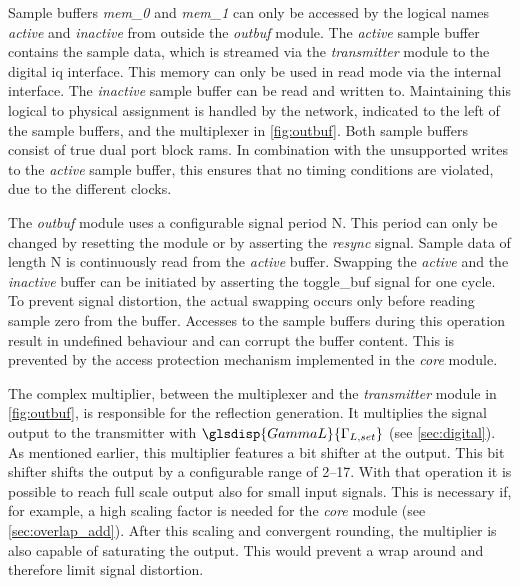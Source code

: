\documentclass[12pt,a4paper,parskip=full,abstract=true,BCOR=12mm]{scrreprt}
\def\device#1{\mbox{\textit{#1}}}
\begin{document}
Sample buffers \device{mem\_0} and \device{mem\_1} can only be accessed by the
logical names \device{active} and \device{inactive} from outside the
\device{outbuf} module. The \device{active} sample buffer contains the sample data,
which is streamed via the \device{transmitter} module to the digital \gls{iq}
interface. This memory can only be used in read mode via the internal interface.
The \device{inactive} sample buffer can be read and written to. Maintaining this
logical to physical assignment is handled by the network, indicated to the left
of the sample buffers, and the multiplexer in \cref{fig:outbuf}. Both sample
buffers consist of true dual port block \glspl{ram}. In combination with the
unsupported writes to the \device{active} sample buffer, this ensures that
no timing conditions are violated, due to the different clocks.

The \device{outbuf} module uses a configurable signal period \gls{N}. This period can only be changed
by resetting the module or by asserting the \device{resync} signal. Sample data of length \gls{N} is
continuously read from the \device{active} buffer. Swapping the \device{active}
and the \device{inactive} buffer can be initiated by asserting the toggle\_buf
signal for one cycle. To prevent signal distortion, the actual swapping occurs
only before reading sample zero from the buffer. Accesses to the sample buffers
during this operation result in undefined behaviour and can corrupt the buffer
content. This is prevented by the access protection mechanism implemented
in the \device{core} module.

The complex multiplier, between the multiplexer and the \device{transmitter}
module in \cref{fig:outbuf}, is responsible for the
reflection generation. It multiplies the signal output to the transmitter
with $\glsdisp{GammaL}{\Gamma_{L,set}}$ (see \cref{sec:digital}). As mentioned earlier, this
multiplier features a bit shifter at the output. This bit shifter shifts the
output by a configurable range of \SIrange{2}{17}{\bit}. With that operation
it is possible to reach full scale output also for small input
signals. This is necessary if, for example, a high scaling factor is needed
for the \device{core} module (see \cref{sec:overlap_add}). After this scaling
and convergent rounding, the multiplier is also capable of saturating the
output. This would prevent a wrap around and therefore limit signal distortion.
\end{document}
